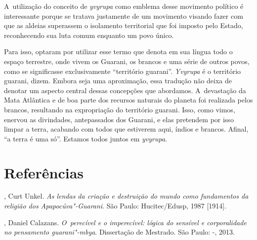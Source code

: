 A~utilização do conceito de \emph{yvyrupa} como emblema desse movimento
político é interessante porque se tratava justamente de um movimento
visando fazer com que as aldeias superassem o isolamento territorial
que foi imposto pelo Estado, reconhecendo sua luta comum enquanto um
povo único.

Para isso, optaram por utilizar esse termo que denota em sua língua todo
o espaço terrestre, onde vivem os Guarani, os brancos e uma série de
outros povos, como se significasse exclusivamente ``território guarani''.
\emph{Yvyrupa} é o território guarani, dizem. Embora seja uma aproximação,
essa tradução não deixa de denotar um aspecto central dessas concepções
que abordamos. A~devastação da Mata Atlântica e de boa parte dos
recursos naturais do planeta foi realizada pelos brancos, resultando na
expropriação do território guarani. Isso, como vimos, enervou as
divindades, antepassados dos Guarani, e elas pretendem por isso limpar
a terra, acabando com todos que estiverem aqui, índios e brancos.
Afinal, ``a terra é uma só''. Estamos todos juntos em \emph{yvyrupa}.

\section{Referências}

\begin{Parskip}
, Curt Unkel. \emph{As lendas da criação e destruição do mundo
como fundamentos da religião dos Apapocúva"-Guarani}. São Paulo: Hucitec/Edusp, 1987 [1914].

, Daniel Calazans. \emph{O~perecível e o imperecível: lógica do
sensível e corporalidade no pensamento guarani"-mbya}. Dissertação de
Mestrado. São Paulo: -, 2013.
\end{Parskip}

\clearpage

\vspace*{\fill}

